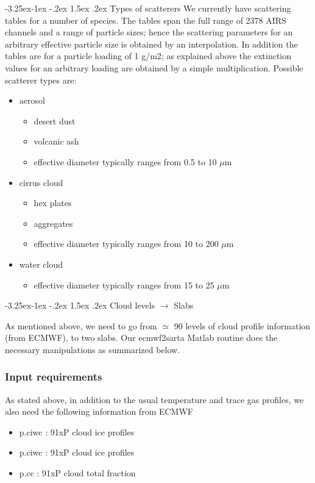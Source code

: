 \documentclass[11pt]{article}
\makeatletter
\newcommand{\ecmwfXsarta}{\textsf{ecmwf2sarta}\xspace}
\newcommand{\ecmwf}{\textsf{ECMWF}\xspace}
\renewcommand{\subsection}{\@startsection{subsection}{2}{\z@}%
                                     {-3.25ex\@plus -1ex \@minus -.2ex}%
                                     {1.5ex \@plus .2ex}%
                                     {\reset@font\normalsize\bfseries}}
\makeatother
\begin{document}
\subsection{Types of scatterers}
We currently have scattering tables for a number of species. The
tables span the full range of 2378 AIRS channels and a range of
particle sizes; hence the scattering parameters for an arbitrary
effective particle size is obtained by an interpolation. In addition
the tables are for a particle loading of 1 g/m2; as explained above
the extinction values for an arbitrary loading are obtained by a
simple multiplication.  Possible scatterer types are:
\begin{itemize}
\item aerosol
  \begin{itemize}
  \item desert dust
  \item volcanic ash
  \item effective diameter typically ranges from 0.5 to 10 $\mu$m
  \end{itemize}
\item cirrus cloud
  \begin{itemize}
  \item hex plates
  \item aggregates
  \item effective diameter typically ranges from 10 to 200 $\mu$m
  \end{itemize}
\item water cloud
  \begin{itemize}
  \item effective diameter typically ranges from 15 to 25 $\mu$m
  \end{itemize}
\end{itemize}

\subsection{Cloud levels $\rightarrow$ Slabs}

As mentioned above, we need to go from $\simeq$ 90 levels of cloud
profile information (from \ecmwf), to two slabs. Our \ecmwfXsarta
Matlab routine does the necessary manipulations as summarized below.

\subsubsection{Input requirements}

As stated above, in addition to the usual temperature and trace gas
profiles, we also need the following information from \ecmwf
\begin{itemize}
\item p.ciwc : 91xP cloud ice profiles
\item p.ciwc : 91xP cloud ice profiles
\item p.cc : 91xP cloud total fraction
\end{itemize}
\end{document}
